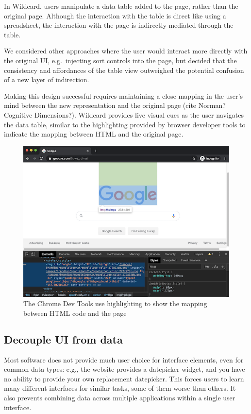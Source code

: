 \documentclass[english,submission]{programming}
\begin{document}
In Wildcard, users manipulate a data table added to the page, rather
than the original page. Although the interaction with the table is
direct like using a spreadsheet, the interaction with the page is
indirectly mediated through the table.

We considered other approaches where the user would interact more
directly with the original UI, e.g.~injecting sort controls into the
page, but decided that the consistency and affordances of the table view
outweighed the potential confusion of a new layer of indirection.

Making this design successful requires maintaining a close mapping in
the user's mind between the new representation and the original page
(cite Norman? Cognitive Dimensions?). Wildcard provides live visual cues
as the user navigates the data table, similar to the highlighting
provided by browser developer tools to indicate the mapping between HTML
and the original page.

\begin{figure}
\hypertarget{fig:devtools}{%
\centering
\includegraphics{media/devtools.png}
\caption{The Chrome Dev Tools use highlighting to show the mapping
between HTML code and the page}\label{fig:devtools}
}
\end{figure}

\hypertarget{decouple-ui-from-data}{%
\subsection{Decouple UI from data}\label{decouple-ui-from-data}}

Most software does not provide much user choice for interface elements,
even for common data types: e.g., the website provides a datepicker
widget, and you have no ability to provide your own replacement
datepicker. This forces users to learn many different interfaces for
similar tasks, some of them worse than others. It also prevents
combining data across multiple applications within a single user
interface.
\end{document}
